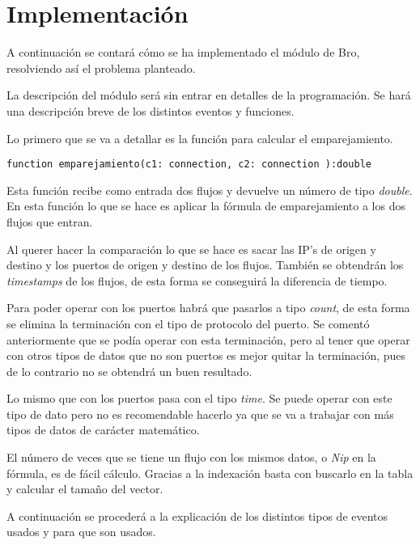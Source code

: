 \chapter{Implementación}\label{implementacion}

A continuación se contará cómo se ha implementado el módulo de Bro, resolviendo así el problema planteado.

\intro La descripción del módulo será sin entrar en detalles de la programación. Se hará una descripción 
breve de los distintos eventos y funciones.

\intro Lo primero que se va a detallar es la función para calcular el emparejamiento.

\begin{lstlisting}[style=CodigoC]
function emparejamiento(c1: connection, c2: connection ):double 

\end{lstlisting}

\intro Esta función recibe como entrada dos flujos y devuelve un número de tipo \textit{double}. En esta función 
lo que se hace es aplicar la fórmula de emparejamiento a los dos flujos que entran.

\intro Al querer hacer la comparación lo que se hace es sacar las IP's de origen y destino y los puertos de 
origen y destino de los flujos. También se obtendrán los \textit{timestamps} de los flujos, de esta forma se 
conseguirá la diferencia de tiempo. 

\intro Para poder operar con los puertos habrá que pasarlos a tipo \textit{count}, de esta forma se elimina la 
terminación con el tipo de protocolo del puerto. Se comentó anteriormente que se podía operar con esta terminación, 
pero al tener que operar con otros tipos de datos que no son puertos es mejor quitar la terminación, pues de lo 
contrario no se obtendrá un buen resultado. 

\intro Lo mismo que con los puertos pasa con el tipo \textit{time}. Se puede operar con este tipo de dato 
pero no es recomendable hacerlo ya que se va a trabajar con más tipos de datos de carácter matemático.

\intro El número de veces que se tiene un flujo con los mismos datos, o \textit{Nip} en la fórmula, es de fácil 
cálculo. Gracias a la indexación basta con buscarlo en la tabla y calcular el tamaño del vector. 

\intro A continuación se procederá a la explicación de los distintos tipos de eventos usados y para que son usados.


